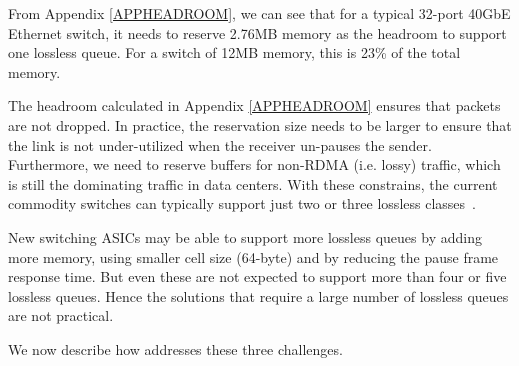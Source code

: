 From Appendix \ref{APPHEADROOM}, we can see that for a typical 32-port 40GbE
Ethernet switch, it needs to reserve 2.76MB memory as the headroom to support
one lossless queue. For a switch of 12MB memory, this is 23\% of the total
memory.

The headroom calculated in Appendix \ref{APPHEADROOM} ensures that  
packets are not dropped. In practice, the reservation size needs to be larger to 
ensure that the link is not under-utilized when the receiver un-pauses the
sender. Furthermore, we need to reserve buffers for non-RDMA (i.e. lossy) traffic, which is
still the dominating traffic in data centers. With these constrains, the
current commodity switches can typically support just two or three lossless
classes~\cite{rdmaatscale}.

New switching ASICs may be able to support more lossless queues by adding more
memory, using smaller cell size (64-byte) and by reducing the pause frame
response time. But even these are not expected to support more than four or five
lossless queues. Hence the solutions that require a large number of lossless
queues are not practical. 

We now describe how \sysname{} addresses these three challenges. 
